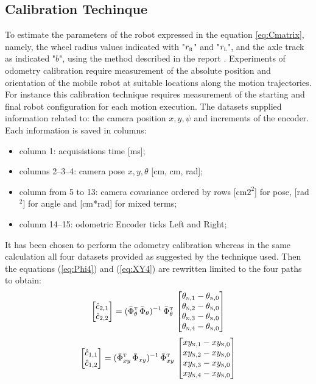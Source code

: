\subsection{Calibration Techinque}
To estimate the parameters of the robot expressed in the equation \ref{eq:Cmatrix}, namely, the wheel radius values indicated with "$r_\textsc{r}$" and "$r_\textsc{l}$", and the axle track as indicated "$b$", using the method described in the report \cite{1512356}.
Experiments of odometry calibration require measurement of the absolute position and orientation of the mobile robot at suitable locations along the motion trajectories. For instance this calibration technique requires measurement of the starting and final robot configuration for each motion execution. The datasets supplied information related to: the camera position $x, y, \psi$ and increments of the encoder.
Each information is saved in columns:
\begin{itemize}
\item column 1: acquisistions time [ms];
\item columns 2--3--4: camera pose $x, y, \theta$ [cm, cm, rad];
\item column from 5 to 13: camera covariance ordered by rows [cm$2^2$] for pose, [rad$^2$] for angle and [cm*rad] for mixed terms;
\item colunm 14--15: odometric Encoder ticks Left and Right;
\end{itemize}
It has been chosen to perform the odometry calibration whereas in the same calculation all four datasets provided as suggested by the technique used. Then the equations (\ref{eq:Phi4}) and (\ref{eq:XY4}) are rewritten limited to the four paths to obtain:
\begin{equation}
\label{eq:Phi4}
	\begin{bmatrix}
		\hat{c}_{2,1}\\
		\hat{c}_{2,2}
	\end{bmatrix} =	(\bar{\Phi}_{\theta}^{\textsc{t}} \, \bar{\Phi}_{\theta})^{-1} \, \bar{\Phi}_{\theta}^{\textsc{t}} \, 
	\begin{bmatrix}
		\theta_{\textsc{n},1} - \theta_{\textsc{n},0}\\
		\theta_{\textsc{n},2} - \theta_{\textsc{n},0}\\
		\theta_{\textsc{n},3} - \theta_{\textsc{n},0}\\
		\theta_{\textsc{n},4} - \theta_{\textsc{n},0}
	\end{bmatrix}
\end{equation}
\begin{equation}
\label{eq:XY4}
	\begin{bmatrix}
		\hat{c}_{1,1}\\
		\hat{c}_{1,2}
	\end{bmatrix} = (\bar{\Phi}_{xy}^{\textsc{t}} \, \bar{\Phi}_{xy})^{-1} \, \bar{\Phi}_{xy}^{\textsc{t}} \, 
	\begin{bmatrix}
		xy_{\textsc{n},1} - xy_{\textsc{n},0}\\
		xy_{\textsc{n},2} - xy_{\textsc{n},0}\\
		xy_{\textsc{n},3} - xy_{\textsc{n},0}\\
		xy_{\textsc{n},4} - xy_{\textsc{n},0}
	\end{bmatrix}
\end{equation}
